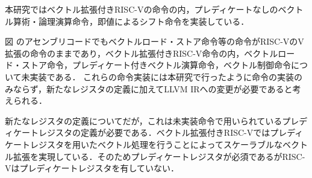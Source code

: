 
本研究ではベクトル拡張付きRISC-Vの命令の内，プレディケートなしのベクトル算術・論理演算命令，即値によるシフト命令を実装している．

図%
のアセンブリコードでもベクトルロード・ストア命令等の命令がRISC-VのV拡張の命令のままであり，ベクトル拡張付きRISC-V命令の内，ベクトルロード・ストア命令，プレディケート付きベクトル演算命令，ベクトル制御命令について未実装である．
これらの命令実装には本研究で行ったように命令の実装のみならず，新たなレジスタの定義に加えてLLVM IRへの変更が必要であると考えられる．

新たなレジスタの定義についてだが，これは未実装命令で用いられているプレディケートレジスタの定義が必要である．ベクトル拡張付きRISC-Vではプレディケートレジスタを用いたベクトル処理を行うことによってスケーラブルなベクトル拡張を実現している．そのためプレディケートレジスタが必須であるがRISC-Vはプレディケートレジスタを有していない．